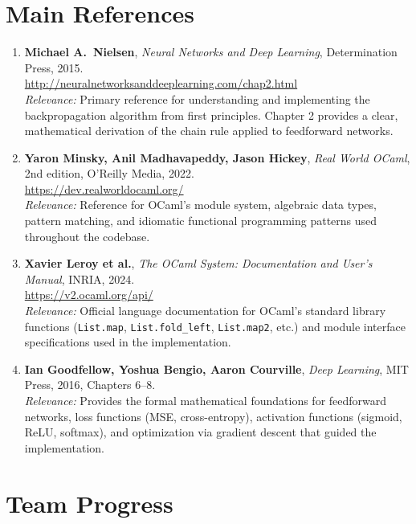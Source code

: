 \documentclass[12pt, a4paper]{article}
\begin{document}
\section{Main References}

\begin{enumerate}[leftmargin=1.5cm]
    \item \textbf{Michael A.\ Nielsen}, \textit{Neural Networks and Deep Learning}, Determination Press, 2015.\\
    \url{http://neuralnetworksanddeeplearning.com/chap2.html}\\
    \textit{Relevance:} Primary reference for understanding and implementing the backpropagation algorithm from first principles. Chapter 2 provides a clear, mathematical derivation of the chain rule applied to feedforward networks.
    
    \item \textbf{Yaron Minsky, Anil Madhavapeddy, Jason Hickey}, \textit{Real World OCaml}, 2nd edition, O'Reilly Media, 2022.\\
    \url{https://dev.realworldocaml.org/}\\
    \textit{Relevance:} Reference for OCaml's module system, algebraic data types, pattern matching, and idiomatic functional programming patterns used throughout the codebase.
    
    \item \textbf{Xavier Leroy et al.}, \textit{The OCaml System: Documentation and User's Manual}, INRIA, 2024.\\
    \url{https://v2.ocaml.org/api/}\\
    \textit{Relevance:} Official language documentation for OCaml's standard library functions (\texttt{List.map}, \texttt{List.fold\_left}, \texttt{List.map2}, etc.) and module interface specifications used in the implementation.
    
    \item \textbf{Ian Goodfellow, Yoshua Bengio, Aaron Courville}, \textit{Deep Learning}, MIT Press, 2016, Chapters 6--8.\\
    \textit{Relevance:} Provides the formal mathematical foundations for feedforward networks, loss functions (MSE, cross-entropy), activation functions (sigmoid, ReLU, softmax), and optimization via gradient descent that guided the implementation.
\end{enumerate}

\section{Team Progress}
\end{document}
